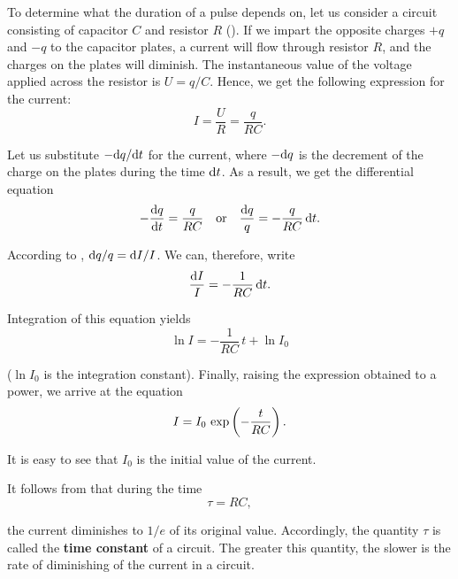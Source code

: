 To determine what the duration of a pulse depends on, let us consider a circuit consisting of capacitor $C$ and resistor $R$ ().
If we impart the opposite charges $+q$ and $-q$ to the capacitor plates, a current will flow through resistor $R$, and the charges on the plates will diminish.
The instantaneous value of the voltage applied across the resistor is $U=q/C$.
Hence, we get the following expression for the current:
\begin{equation}\label{eq:12_9}
    I = \frac{U}{R} = \frac{q}{RC}.
\end{equation}

\noindent
Let us substitute $-\mathrm{d} q/\mathrm{d} t$ for the current, where $-\mathrm{d} q$ is the decrement of the charge on the plates during the time $\mathrm{d} t$.
As a result, we get the differential equation
\begin{equation*}
    -\dfrac{\mathrm{d} q}{\mathrm{d} t} = \frac{q}{RC}\quad \text{or} \quad \frac{\mathrm{d} q}{q} = -\frac{q}{RC}\, \mathrm{d} t.
\end{equation*}

\noindent
According to , $\mathrm{d} q/q=\mathrm{d} I/I$.
We can, therefore, write
\begin{equation*}
    \frac{\mathrm{d} I}{I} = - \frac{1}{RC}\, \mathrm{d} t.
\end{equation*}

\noindent
Integration of this equation yields
\begin{equation*}
    \ln{I} = - \frac{1}{RC}\, t + \ln{I_0}
\end{equation*}

\noindent
($\ln{I_0}$ is the integration constant).
Finally, raising the expression obtained to a power, we arrive at the equation
\begin{equation}\label{eq:12_10}
    I = I_0\, \exp\left(- \frac{t}{RC}\right).
\end{equation}

\noindent
It is easy to see that $I_0$ is the initial value of the current.

It follows from  that during the time
\begin{equation}\label{eq:12_11}
    \tau = RC,
\end{equation}

\noindent
the current diminishes to $1/e$ of its original value.
Accordingly, the quantity $\tau$ is called the \textbf{time constant} of a circuit.
The greater this quantity, the slower is the rate of diminishing of the current in a circuit.


